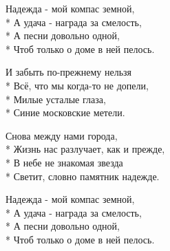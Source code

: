 \medskip

\begin{minipage}{\linewidth}
\hspace*{1.5em}Надежда - мой компас земной,\\*
\hspace*{1.5em}А удача - награда за смелость,\\*
\hspace*{1.5em}А песни довольно одной,\\*
\hspace*{1.5em}Чтоб только о доме в ней пелось.\\
\end{minipage}\par\medskip\nobreak

\medskip

\begin{minipage}{\linewidth}
И забыть по-прежнему нельзя\\*
Всё, что мы когда-то не допели,\\*
Милые усталые глаза,\\*
Синие московские метели.\\
\end{minipage}\par\medskip\nobreak

\medskip

\begin{minipage}{\linewidth}
Снова между нами города,\\*
Жизнь нас разлучает, как и прежде,\\*
В небе не знакомая звезда\\*
Светит, словно памятник надежде.\\
\end{minipage}\par\medskip\nobreak

\medskip

\begin{minipage}{\linewidth}
\hspace*{1.5em}Надежда - мой компас земной,\\*
\hspace*{1.5em}А удача - награда за смелость,\\*
\hspace*{1.5em}А песни довольно одной,\\*
\hspace*{1.5em}Чтоб только о доме в ней пелось.\\
\end{minipage}

